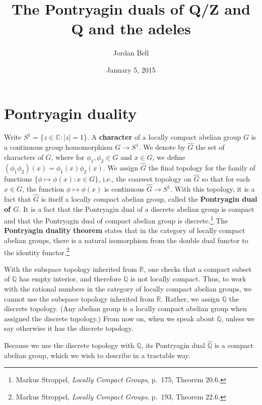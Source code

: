 \documentclass{article}
\theoremstyle{definition}
\theoremstyle{definition}
\begin{document}
\title{The Pontryagin duals of \textbf{Q}/\textbf{Z} and \textbf{Q} and the adeles}
\author{Jordan Bell}
\date{January 5, 2015}

\maketitle



\section{Pontryagin duality}
Write $S^1=\{z \in \mathbb{C}: |z|=1\}$. 
A \textbf{character} of a locally compact abelian group $G$ is a continuous group homomorphism $G \to S^1$.
We denote by $\widehat{G}$ the set of characters of $G$, where for $\phi_1,\phi_2 \in \widehat{G}$ and $x \in G$,
we define $(\phi_1 \phi_2)(x)=\phi_1(x)\phi_2(x)$. We assign $\widehat{G}$ the final topology for the family of functions
$\{\phi \mapsto \phi(x): x \in G\}$, i.e., the coarsest topology on $\widehat{G}$ so that for each $x \in G$, the function $\phi \mapsto \phi(x)$ is continuous
$\widehat{G} \to S^1$. With this topology, it is a fact that $\widehat{G}$ is itself a locally compact abelian group, called  the \textbf{Pontryagin dual of $G$}.
It is a fact that the Pontryagin dual of a discrete abelian group is compact and that the Pontryagin dual of compact abelian group is discrete.\footnote{Markus Stroppel, {\em Locally Compact Groups},
p.~175, Theorem 20.6.}
The \textbf{Pontryagin duality theorem} states that in the category
of locally compact abelian groups, there is a natural
isomorphism from the double dual functor to the identity functor.\footnote{Markus Stroppel, {\em Locally Compact Groups},
p.~193, Theorem 22.6.}


With the subspace topology inherited from
$\mathbb{R}$, one checks that
a compact subset of $\mathbb{Q}$ has empty
interior, and therefore $\mathbb{Q}$ is not locally compact.
Thus, to work with the rational numbers in the category of locally compact abelian groups, we cannot use the subspace topology inherited from
$\mathbb{R}$. Rather, we assign $\mathbb{Q}$ the discrete topology. (Any abelian group is a locally compact abelian group when assigned the discrete
topology.) From now on, when we speak about $\mathbb{Q}$, unless we say otherwise it has the discrete topology.

Because we use the discrete topology with $\mathbb{Q}$, its Pontryagin
dual $\widehat{\mathbb{Q}}$ is a compact abelian group, which we wish to describe in a tractable way. 
\end{document}
